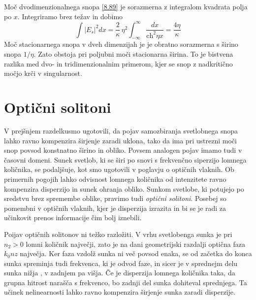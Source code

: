 \documentclass[11pt,fleqn]{book} %
\begin{document}
Moč dvodimenzionalnega snopa \ref{8.89} je sorazmerna z integralom
kvadrata polja po $x.$ Integriramo brez težav in dobimo 
\begin{equation}
\int|E_{s}|^{2}dx=\frac{2}{\kappa}\,\eta^{2}\int_{-\infty}^{\infty}\frac{dx}{\text{ch}^{2}\eta x}=\frac{4\eta}{\kappa}
\end{equation}
 Moč stacionarnega snopa v dveh dimenzijah je je obratno sorazmerna
s širino snopa $1/\eta$. Zato obstoja pri poljubni moči stacionarna
širina. To je bistvena razlika med dvo- in tridimenzionalnim primerom,
kjer se snop z nadkritično močjo krči v singularnost.


\section{Optični solitoni}

V prejšnjem razdelkusmo ugotovili, da pojav samozbiranja svetlobnega
snopa lahko ravno kompenzira širjenje zaradi uklona, tako da ima pri
ustrezni moči snop povsod konstnatno širino in obliko. Povsem analogen
pojav imamo tudi v časovni domeni. Sunek svetlob, ki se širi po snovi
s frekvenčno siperzijo lomnega količnika, se podaljšuje, kot smo ugotovili
v poglavju o optičnih vlaknih. Ob primernih pogojih lahko odvisnost
lomnega količnika od intenzitete ravno kompenzira disperzijo in sunek
ohranja obliko. Sunkom svetlobe, ki potujejo po sredstvu brez spremembe
oblike, pravimo tudi \textit{optični solitoni}. Posebej so pomembni
v optičnih vlaknih, kjer je disperzija izrazita in bi se je radi za
učinkovit prenos informacije čim bolj iznebili.

Poijav optičnih solitonov ni težko razložiti. V vrhu svetlobenga sunka
je pri $n_{2}>0$ lomni količnik največji, zato je na dani geometrijski
razdalji optična faza $k_{0}nz$ največja. Ker faza vzdolž sunka ni
več povsod enaka, se od začetka do konca sunka spreminja tudi frekvenca,
ki je odvod faze, in sicer je v sprednejm delu sunka nižja , v zadnjem
pa višja. Če je disperzija lomnega količnika taka, da grupna hitrost
narašča s frekvenco, bo zadnji del sunka dohiteval sprednjega. Ta
učinek nelinearnosti lahko ravno kompenzira širjenje sunka zaradi
disperzije.
\end{document}
